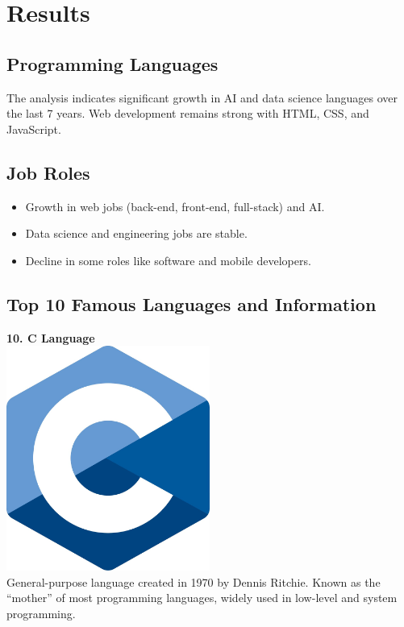 \documentclass[12pt,a4paper]{article}
\begin{document}
\section*{Results}

\subsection*{Programming Languages}
The analysis indicates significant growth in AI and data science languages 
over the last 7 years. Web development remains strong with HTML, CSS, and JavaScript.

\subsection*{Job Roles}
\begin{itemize}
    \item Growth in web jobs (back-end, front-end, full-stack) and AI.
    \item Data science and engineering jobs are stable.
    \item Decline in some roles like software and mobile developers.
\end{itemize}

\subsection*{Top 10 Famous Languages and Information}

\textbf{10. C Language} \\
\includegraphics[width=0.5\textwidth]{images/clang.jpg} \\
General-purpose language created in 1970 by Dennis Ritchie. Known as the ``mother'' of most programming languages, widely used in low-level and system programming.
\end{document}
